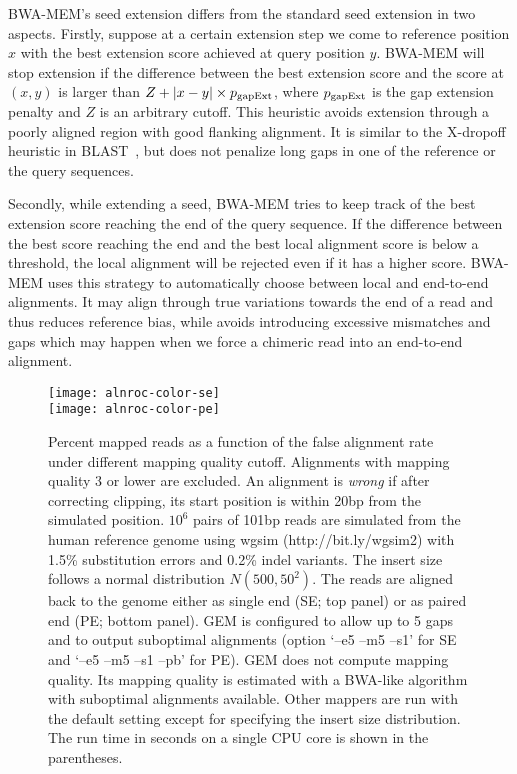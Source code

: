 \documentclass{bioinfo}
\begin{document}
\begin{methods}
BWA-MEM's seed extension differs from the standard seed extension in two
aspects. Firstly, suppose at a certain extension step we come to reference
position $x$ with the best extension score achieved at query position $y$.
BWA-MEM will stop extension if the difference between the best extension score
and the score at $(x,y)$ is larger than $Z+|x-y|\times p_{\rm gapExt}$, where
$p_{\rm gapExt}$ is the gap extension penalty and $Z$ is an arbitrary cutoff.
This heuristic avoids extension through a poorly aligned region with good
flanking alignment. It is similar to the X-dropoff heuristic in
BLAST~\citep{Altschul:1997vn}, but does not penalize long gaps in one of the
reference or the query sequences.

Secondly, while extending a seed, BWA-MEM tries to keep track of the best
extension score reaching the end of the query sequence. If the difference
between the best score reaching the end and the best local alignment score is
below a threshold, the local alignment will be rejected even if it has a higher
score. BWA-MEM uses this strategy to automatically choose between local and
end-to-end alignments. It may align through true variations towards the end of
a read and thus reduces reference bias, while avoids introducing excessive
mismatches and gaps which may happen when we force a chimeric read into an
end-to-end alignment.

\begin{figure}[tb]
\centering
\texttt{[image: alnroc-color-se]}\\
\texttt{[image: alnroc-color-pe]}
\caption{Percent mapped reads as a function of the false alignment rate under
different mapping quality cutoff. Alignments with mapping quality 3 or lower
are excluded. An alignment is \emph{wrong} if after correcting clipping, its
start position is within 20bp from the simulated position. $10^6$ pairs
of 101bp reads are simulated from the human reference genome using wgsim
(http://bit.ly/wgsim2) with 1.5\% substitution errors and 0.2\% indel variants.
The insert size follows a normal distribution $N(500,50^2)$. The reads are
aligned back to the genome either as single end (SE; top panel) or as paired
end (PE; bottom panel). GEM is configured to allow up to 5 gaps and to output
suboptimal alignments (option `--e5 --m5 --s1' for SE and `--e5 --m5 --s1 --pb'
for PE). GEM does not compute mapping quality. Its mapping quality is estimated
with a BWA-like algorithm with suboptimal alignments available. Other mappers
are run with the default setting except for specifying the insert size
distribution.
The run time in seconds on a single CPU core is shown in the
parentheses.}\label{fig:eval}
\end{figure}


\end{methods}
\end{document}
